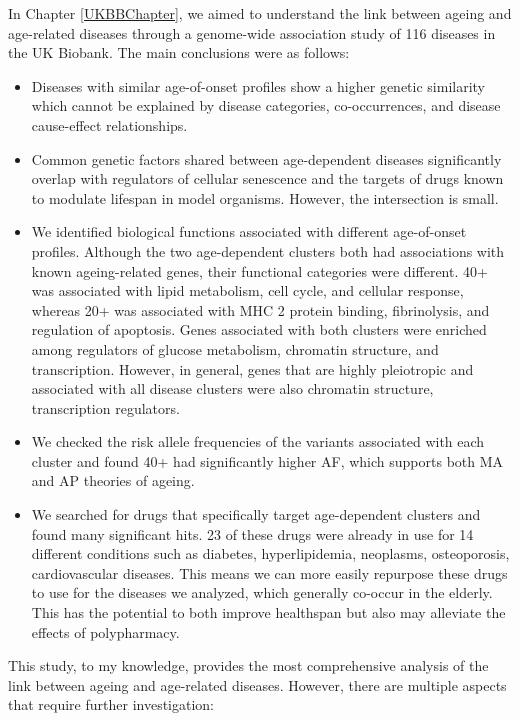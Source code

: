 \documentclass[12pt,twoside]{unicam}
\providecommand{\tightlist}{%
  \setlength{\itemsep}{0pt}\setlength{\parskip}{0pt}}
\begin{document}
In Chapter \ref{UKBBChapter}, we aimed to understand the link between ageing and age-related diseases through a genome-wide association study of 116 diseases in the UK Biobank. The main conclusions were as follows:

\begin{itemize}
\tightlist
\item
  Diseases with similar age-of-onset profiles show a higher genetic similarity which cannot be explained by disease categories, co-occurrences, and disease cause-effect relationships.
\item
  Common genetic factors shared between age-dependent diseases significantly overlap with regulators of cellular senescence and the targets of drugs known to modulate lifespan in model organisms. However, the intersection is small.
\item
  We identified biological functions associated with different age-of-onset profiles. Although the two age-dependent clusters both had associations with known ageing-related genes, their functional categories were different. 40+ was associated with lipid metabolism, cell cycle, and cellular response, whereas 20+ was associated with MHC 2 protein binding, fibrinolysis, and regulation of apoptosis. Genes associated with both clusters were enriched among regulators of glucose metabolism, chromatin structure, and transcription. However, in general, genes that are highly pleiotropic and associated with all disease clusters were also chromatin structure, transcription regulators.
\item
  We checked the risk allele frequencies of the variants associated with each cluster and found 40+ had significantly higher AF, which supports both MA and AP theories of ageing.
\item
  We searched for drugs that specifically target age-dependent clusters and found many significant hits. 23 of these drugs were already in use for 14 different conditions such as diabetes, hyperlipidemia, neoplasms, osteoporosis, cardiovascular diseases. This means we can more easily repurpose these drugs to use for the diseases we analyzed, which generally co-occur in the elderly. This has the potential to both improve healthspan but also may alleviate the effects of polypharmacy.
\end{itemize}

This study, to my knowledge, provides the most comprehensive analysis of the link between ageing and age-related diseases. However, there are multiple aspects that require further investigation:
\end{document}
